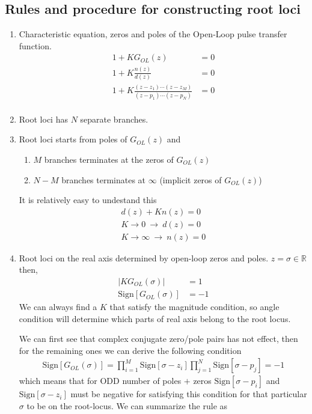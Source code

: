 \documentclass[twoside]{article}
\begin{document}
\subsection*{Rules and procedure for constructing root loci}

\begin{enumerate} 

\item Characteristic equation, zeros and poles of the
  Open-Loop pulse transfer function.
%
\begin{align*}
1 + K G_{OL}(z)  &= 0 \\
1 + K \frac{n(z)}{d(z)} &= 0 \\
1 + K \frac{(z - z_1) \cdots (z - z_M)}{(z - p_1) \cdots (z - p_N)} &= 0 \\
\end{align*}
%

\item Root loci has $N$ separate branches. 

\item Root loci starts from poles of $G_{OL}(z)$ and 
%
\begin{enumerate} 
   \item $M$ branches terminates at the zeros of $G_{OL}(z)$
   \item $N-M$ branches terminates at $\infty$ (implicit zeros of $G_{OL}(z)$)
\end{enumerate}

It is relatively easy to undestand this 
%
\begin{align*}
d(z) + K n(z) = 0 
\\
K \to 0 \ \rightarrow \ d(z) = 0
\\
K \to \infty \ \rightarrow \ n(z) = 0
\end{align*}

\item Root loci on the real axis determined by open-loop zeros and
  poles. $z = \sigma \in \mathbb{R}$ then, 
%
\begin{align*}
| K G_{OL}(\sigma) | &= 1
\\
\mathrm{Sign} [ G_{OL}(\sigma) ] &= -1
\end{align*}
%
We can always find a $K$ that satisfy the magnitude condition, so
angle condition will determine which parts of real axis belong to the
root locus.

We can first see that complex conjugate zero/pole pairs has not effect, then for
the remaining ones we can derive the following condition
%
\begin{align*}
\mathrm{Sign} [ G_{OL}(\sigma) ] = \prod_{i=1}^M  \mathrm{Sign} [\sigma - z_i]
  \prod_{j=1}^N  \mathrm{Sign} [\sigma - p_j] = -1
\end{align*}
%
which means that for ODD number of poles $+$  zeros 
$\mathrm{Sign} [\sigma - p_i ]$ and $\mathrm{Sign} [\sigma - z_i] $ 
must be negative for satisfying this condition for that particular $\sigma$
to be on the root-locus. We can summarize the rule as


\end{enumerate}
\end{document}
